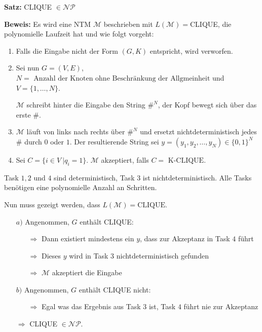 \documentclass{scrartcl}%
\begin{document}
    \newpage
    \vspace*{0.3cm}
    \textbf{\textsf{Satz:}}
    CLIQUE $\in \mathcal{N}\mathcal{P}$

    \vspace*{0.3cm}
    \textbf{\textsf{Beweis:}} Es wird eine NTM $\mathcal{M}$ beschrieben mit $L(\mathcal{M}) =$CLIQUE,
    die polynomielle Laufzeit hat und wie folgt vorgeht:
    \begin{enumerate}
        \item Falls die Eingabe nicht der Form $(G,K)$ entspricht, wird verworfen.
        \item Sei nun $G=(V, E)$, $N=\text{ Anzahl der Knoten ohne Beschränkung der Allgmeinheit}$ und $V=\{1, \dots, N\}$.

        $\mathcal{M}$ schreibt hinter die Eingabe den String  $\#^N$, der Kopf bewegt sich über das erste $\#$.
        \item $\mathcal{M}$ läuft von links nach rechts über $\#^N$ und ersetzt nichtdeterministisch jedes $\#$ durch $0$ oder $1$.
        Der resultierende String sei $y = (y_1, y_2, \dots, y_N) \in \{0,1\}^N$
        \item Sei $C = \{ i \in V\ |q_i = 1\}$. $\mathcal{M}$ akzeptiert, falls $C = \text{ K-CLIQUE}$.
    \end{enumerate}

    Task $1,2$ und $4$ sind deterministisch, Task $3$ ist nichtdeterministisch.
    Alle Tasks benötigen eine polynomielle Anzahl an Schritten.

    \vspace*{0.3cm}
    Nun muss gezeigt werden, dass $L(\mathcal{M}) = \text{CLIQUE}$.

    \begin{itemize}
        \item [$a)$] Angenommen, $G$ enthält CLIQUE:
        \begin{itemize}
            \item [$\Rightarrow$] Dann existiert mindestens ein $y$, dass zur Akzeptanz in Task $4$ führt
            \item [$\Rightarrow$] Dieses $y$ wird in Task $3$ nichtdeterministisch gefunden
            \item [$\Rightarrow$] $\mathcal{M}$ akzeptiert die Eingabe
        \end{itemize}
        \item [$b)$] Angenommen, $G$ enthält CLIQUE nicht:
        \begin{itemize}
            \item [$\Rightarrow$] Egal was das Ergebnis aus Task $3$ ist, Task $4$ führt nie zur Akzeptanz
        \end{itemize}
        \item [$\Rightarrow$] CLIQUE $\in \mathcal{N}\mathcal{P}$.\proofend
    \end{itemize}
\end{document}
